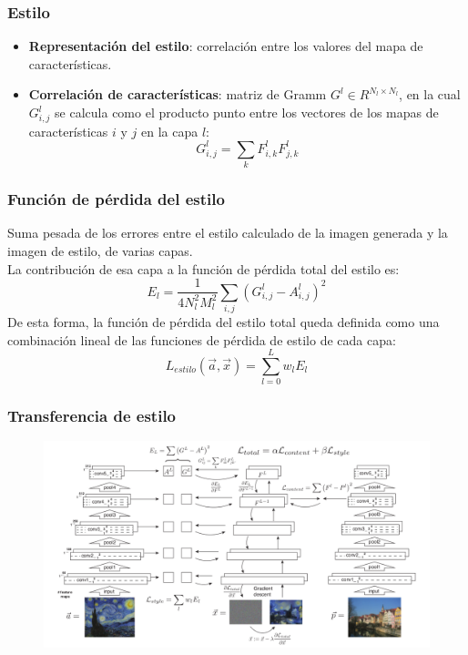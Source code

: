 \documentclass[10pt,center]{beamer}
\begin{document}
\begin{frame}
 \frametitle{Estilo}
  \begin{itemize}
    \item \textbf{Representación del estilo}: correlación entre los valores del mapa de características.
    \item \textbf{Correlación de características}: matriz de Gramm $G^l \in R^{N_l \times N_l}$, en la cual $G_{i,j}^l$ se calcula como el producto punto entre los vectores
      de los mapas de características $i$ y $j$ en la capa $l$:
	\begin{equation*}
	  G_{i,j}^l = \sum_{k} F_{i,k}^l F_{j,k}^l
	\end{equation*}
  \end{itemize}

\end{frame}

\begin{frame}
  \frametitle{Función de pérdida del estilo}
  Suma pesada de los errores entre el estilo calculado de la imagen generada y la imagen de estilo, de varias capas.\\
    La contribución de esa capa a la función de pérdida total del estilo es:
      \begin{equation*}
       E_l = \frac{1}{4 N_l^2 M_l^2} \sum_{i,j} (G_{i,j}^l - A_{i,j}^l)^2
      \end{equation*}
      De esta forma, la función de pérdida del estilo total queda definida como una combinación lineal de las funciones de pérdida de estilo de cada capa:
      \begin{equation*}
       L_{estilo}(\overrightarrow{a},\overrightarrow{x}) = \sum_{l=0}^{L} w_l E_l
      \end{equation*}
\end{frame}


\begin{frame}
  \frametitle{Transferencia de estilo}
  \begin{figure}[h]
    \begin{center}
      \includegraphics[width=\textwidth]{./img/gatys_method.png}
    \end{center}
  \end{figure}
\end{frame}
\end{document}
